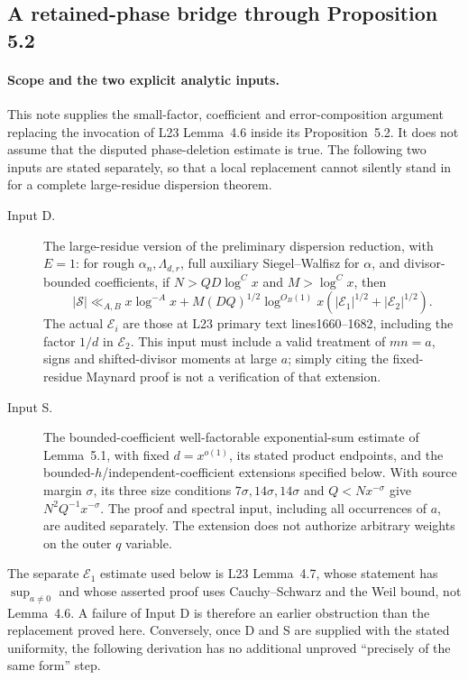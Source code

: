 \subsection{A retained-phase bridge through Proposition 5.2}
\label{sec:lichtman-prop52-retained-phase-bridge-20261009}

\paragraph{Scope and the two explicit analytic inputs.}
This note supplies the small-factor, coefficient and error-composition
argument replacing the invocation of L23 Lemma~4.6 inside its
Proposition~5.2. It does not assume that the disputed phase-deletion
estimate is true. The following two inputs are stated separately,
so that a local replacement cannot silently stand in for a complete
large-residue dispersion theorem.

\begin{description}
\item[Input D.] The large-residue version of the preliminary dispersion
reduction, with $E=1$: for rough $\alpha_n,\Lambda_{d,r}$, full
auxiliary Siegel--Walfisz for $\alpha$, and divisor-bounded coefficients,
if $N>QD\log^{C}x$ and $M>\log^{C}x$, then
\[
 |\mathcal S|\ll_{A,B}
 x\log^{-A}x+M(DQ)^{1/2}\log^{O_B(1)}x
       (|\mathcal E_1|^{1/2}+|\mathcal E_2|^{1/2}).       \tag{D}
\]
The actual $\mathcal E_i$ are those at L23 primary text
lines1660--1682, including the factor $1/d$ in $\mathcal E_2$.
This input must include a valid treatment of $mn=a$, signs and
shifted-divisor moments at large $a$; simply citing the fixed-residue
Maynard proof is not a verification of that extension.

\item[Input S.] The bounded-coefficient well-factorable exponential-sum
estimate of Lemma~5.1, with fixed $d=x^{o(1)}$, its stated product
endpoints, and the bounded-$h$/independent-coefficient extensions
specified below. With source margin $\sigma$, its three size
conditions $7\sigma,14\sigma,14\sigma$ and $Q<Nx^{-\sigma}$
give $N^2Q^{-1}x^{-\sigma}$. The proof and spectral input, including
all occurrences of $a$, are audited separately. The extension does
not authorize arbitrary weights on the outer $q$ variable.
\end{description}

The separate $\mathcal E_1$ estimate used below is L23 Lemma~4.7,
whose statement has $\sup_{a\ne0}$ and whose asserted proof uses
Cauchy--Schwarz and the Weil bound, not Lemma~4.6. A failure of
Input D is therefore an earlier obstruction than the replacement
proved here. Conversely, once D and S are supplied with the stated
uniformity, the following derivation has no additional unproved
``precisely of the same form'' step.

